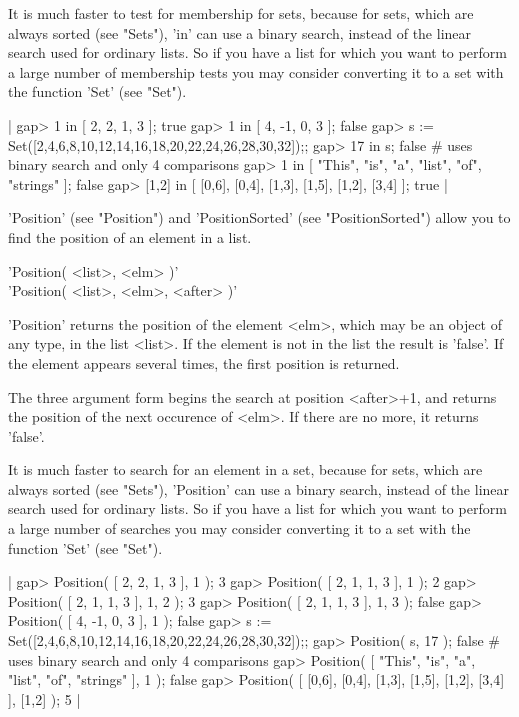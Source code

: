It is  much faster  to test for  membership for  sets, because for  sets,
which  are always sorted  (see "Sets"),   'in'  can use a  binary search,
instead of the linear search used  for ordinary lists.   So if you have a
list for which you want to perform a large number of membership tests you
may consider converting it to a set with the function 'Set' (see "Set").

|    gap> 1 in [ 2, 2, 1, 3 ];
    true
    gap> 1 in [ 4, -1, 0, 3 ];
    false
    gap> s := Set([2,4,6,8,10,12,14,16,18,20,22,24,26,28,30,32]);;
    gap> 17 in s;
    false        # uses binary search and only 4 comparisons
    gap> 1 in [ "This", "is", "a", "list", "of", "strings" ];
    false
    gap> [1,2] in [ [0,6], [0,4], [1,3], [1,5], [1,2], [3,4] ];
    true |

'Position' (see  "Position") and  'PositionSorted' (see "PositionSorted")
allow you to find the position of an element in a list.

%

'Position( <list>, <elm> )'\\
'Position( <list>, <elm>, <after> )'

'Position'  returns  the position of the element <elm>,  which may be  an
object  of  any type, in  the list <list>.  If the  element is not in the
list the  result is  'false'.  If  the element appears several times, the
first position is returned.

The three  argument form  begins the  search  at position  <after>+1, and
returns the position  of the  next occurence  of  <elm>. If there  are no
more, it returns 'false'.

It is  much faster to  search for an element  in a set, because for sets,
which are always sorted (see "Sets"), 'Position' can use a binary search,
instead of the  linear search used for ordinary  lists.  So if you have a
list for which you want  to perform a large  number  of searches you  may
consider converting it to a set with the function 'Set' (see "Set").

|    gap> Position( [ 2, 2, 1, 3 ],  1 );
    3
    gap> Position( [ 2, 1, 1, 3 ], 1 );
    2
    gap> Position( [ 2, 1, 1, 3 ], 1, 2 );
    3
    gap> Position( [ 2, 1, 1, 3 ], 1, 3 );
    false
    gap> Position( [ 4, -1, 0, 3 ],  1 );
    false
    gap> s := Set([2,4,6,8,10,12,14,16,18,20,22,24,26,28,30,32]);;
    gap> Position( s,  17 );
    false        # uses binary search and only 4 comparisons
    gap> Position( [ "This", "is", "a", "list", "of", "strings" ],  1 );
    false
    gap> Position( [ [0,6], [0,4], [1,3], [1,5], [1,2], [3,4] ],  [1,2] );
    5 |

